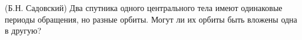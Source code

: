 (Б.Н. Садовский)
Два спутника одного центрального тела имеют одинаковые периоды обращения,
но разные орбиты. Могут ли их орбиты быть вложены одна в
другую?
